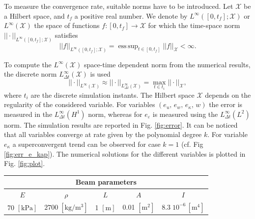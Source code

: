 \documentclass{ifacconf}
\DeclareMathOperator*{\esssup}{ess\,sup}
\begin{document}
To measure the convergence rate,  suitable norms have to be introduced. 
Let $\mathcal{X}$ be a Hilbert space, and $t_f$ a positive real number. We denote by $L^\infty([0, t_f]; \mathcal{X})$ or $L^\infty(\mathcal{X})$ the space of functions $f: [0, t_f] \rightarrow \mathcal{X}$ for which the time-space norm $||\cdot||_{L^\infty([0, t_f]; \mathcal{X})}$ satisfies
\[
||f||_{L^\infty([0, t_f]; \mathcal{X})} = \esssup_{t \in [0,t_f]} ||f||_{\mathcal{X}} < \infty.
\]

To compute the $L^\infty (\mathcal{X})$ space-time dependent norm from the numerical results, the discrete norm $L^\infty_{\Delta t} (\mathcal{X})$ is used
\[
||\cdot ||_{L^\infty (\mathcal{X})} \approx || \cdot ||_{L^\infty_{\Delta t} (\mathcal{X})} = \max_{t \in t_i} ||\cdot||_{\mathcal{X}},
\]
where $t_i$ are the discrete simulation instants. The Hilbert space $\mathcal{X}$ depends on the regularity of the considered variable. For variables $(e_u,\, e_w,\, e_\kappa,\, w)$ the error is measured in the $L^\infty_{\Delta t}(H^1)$ norm, whereas for $e_\varepsilon$ is measured using the $L^\infty_{\Delta t}(L^2)$ norm. The simulation results are reported in Fig. \ref{fig:error}. It can be noticed that all variables converge at rate given by the polynomial degree $k$. For variable $e_\kappa$ a superconvergent trend can be observed for case $k=1$ (cf. Fig \ref{fig:err_e_kap}). The numerical solutions for the different variables is plotted in Fig. \ref{fig:plot}.


\begin{table}[h]
	\centering
	\begin{tabular}{ccccc}
		\hline 
		\multicolumn{5}{c}{Beam parameters} \\ 
		\hline 
		$E$ & $\rho$ & $L$  & $A$ & $I$ \\
		70 $[\textrm{kPa}]$ & $2700\; [\textrm{kg}/\textrm{m}^3]$ & 1 $[\textrm{m}]$ &  0.01 $[\textrm{m}^2]$ & $8.3 \; 10^{-6} \, [\textrm{m}^4]$\\ 
		\hline 
	\end{tabular} 
	\captionsetup{width=0.95\linewidth}
	\vspace{1mm}
	\label{tab:par}
\end{table}
\end{document}
